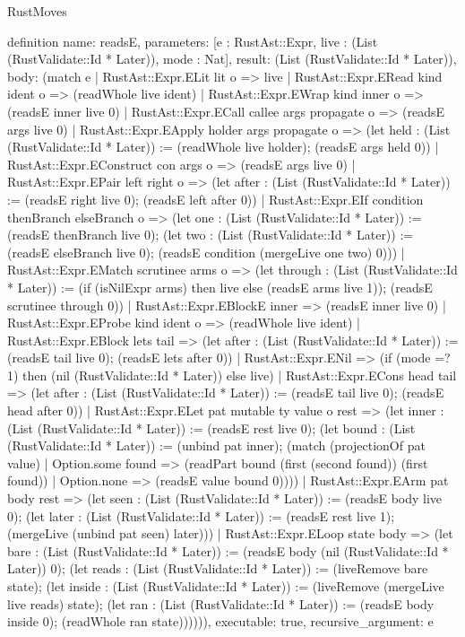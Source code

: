 \begin{lexlean}{RustMoves}
\begin{semanticmodule}
definition{
  name: readsE,
  parameters: [e : RustAst::Expr, live : (List (RustValidate::Id * Later)), mode : Nat],
  result: (List (RustValidate::Id * Later)),
  body: (match e
    | RustAst::Expr.ELit lit o => live
    | RustAst::Expr.ERead kind ident o => (readWhole live ident)
    | RustAst::Expr.EWrap kind inner o => (readsE inner live 0)
    | RustAst::Expr.ECall callee args propagate o => (readsE args live 0)
    | RustAst::Expr.EApply holder args propagate o => (let held : (List (RustValidate::Id * Later)) := (readWhole live holder); (readsE args held 0))
    | RustAst::Expr.EConstruct con args o => (readsE args live 0)
    | RustAst::Expr.EPair left right o => (let after : (List (RustValidate::Id * Later)) := (readsE right live 0); (readsE left after 0))
    | RustAst::Expr.EIf condition thenBranch elseBranch o => (let one : (List (RustValidate::Id * Later)) := (readsE thenBranch live 0); (let two : (List (RustValidate::Id * Later)) := (readsE elseBranch live 0); (readsE condition (mergeLive one two) 0)))
    | RustAst::Expr.EMatch scrutinee arms o => (let through : (List (RustValidate::Id * Later)) := (if (isNilExpr arms) then live else (readsE arms live 1)); (readsE scrutinee through 0))
    | RustAst::Expr.EBlockE inner => (readsE inner live 0)
    | RustAst::Expr.EProbe kind ident o => (readWhole live ident)
    | RustAst::Expr.EBlock lets tail => (let after : (List (RustValidate::Id * Later)) := (readsE tail live 0); (readsE lets after 0))
    | RustAst::Expr.ENil => (if (mode =? 1) then (nil (RustValidate::Id * Later)) else live)
    | RustAst::Expr.ECons head tail => (let after : (List (RustValidate::Id * Later)) := (readsE tail live 0); (readsE head after 0))
    | RustAst::Expr.ELet pat mutable ty value o rest => (let inner : (List (RustValidate::Id * Later)) := (readsE rest live 0); (let bound : (List (RustValidate::Id * Later)) := (unbind pat inner); (match (projectionOf pat value)
      | Option.some found => (readPart bound (first (second found)) (first found))
      | Option.none => (readsE value bound 0))))
    | RustAst::Expr.EArm pat body rest => (let seen : (List (RustValidate::Id * Later)) := (readsE body live 0); (let later : (List (RustValidate::Id * Later)) := (readsE rest live 1); (mergeLive (unbind pat seen) later)))
    | RustAst::Expr.ELoop state body => (let bare : (List (RustValidate::Id * Later)) := (readsE body (nil (RustValidate::Id * Later)) 0); (let reads : (List (RustValidate::Id * Later)) := (liveRemove bare state); (let inside : (List (RustValidate::Id * Later)) := (liveRemove (mergeLive live reads) state); (let ran : (List (RustValidate::Id * Later)) := (readsE body inside 0); (readWhole ran state)))))),
  executable: true,
  recursive_argument: e
}


\end{semanticmodule}
\end{lexlean}
